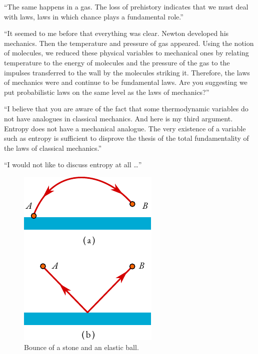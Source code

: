 \begin{dialogue}
``The same happens in a gas. The loss of prehistory indicates that we must deal with  laws, laws in which chance plays a fundamental role.''

\prtnr ``It seemed to me before that everything was clear. Newton developed his mechanics. Then the temperature and pressure of gas appeared. Using the notion of molecules, we reduced these physical variables to mechanical ones by relating temperature to the energy of molecules and the pressure of the gas to the impulses transferred to the wall by the molecules striking it. Therefore, the laws of mechanics were and continue to be fundamental laws. Are you suggesting we put probabilistic laws on the same level as the laws of mechanics?''

\athr ``I believe that you are aware of the fact that some thermodynamic variables do not have analogues in classical mechanics. And here is my third argument. Entropy does not have a mechanical analogue. The very existence of a variable such as entropy is sufficient to disprove the thesis of the total fundamentality of the laws of classical mechanics.''

\prtnr	``I would not like to discuss entropy at all \ldots{}'' 


\end{dialogue}

\begin{figure}
\centering
\includegraphics[width=\linewidth]{figures/reflect.pdf}
\caption{Bounce of a stone and an elastic ball.\label{reflect}}
\end{figure}

